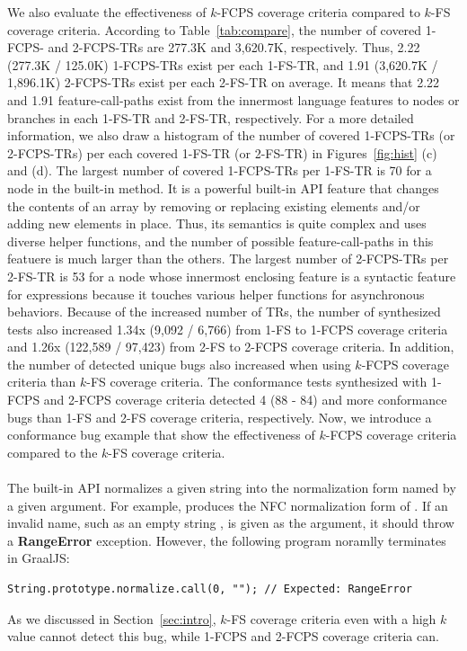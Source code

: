 We also evaluate the effectiveness of $k$-FCPS coverage criteria compared to $k$-FS
coverage criteria.
%
According to Table~\ref{tab:compare}, the number of covered 1-FCPS- and
2-FCPS-TRs are 277.3K and 3,620.7K, respectively.
%
Thus, 2.22 (277.3K / 125.0K) 1-FCPS-TRs exist per each 1-FS-TR, and 1.91
(3,620.7K / 1,896.1K) 2-FCPS-TRs exist per each 2-FS-TR on average.
%
It means that 2.22 and 1.91 feature-call-paths exist from the innermost
language features to nodes or branches in each 1-FS-TR and 2-FS-TR,
respectively.
%
For a more detailed information, we also draw a histogram of the number of
covered 1-FCPS-TRs (or 2-FCPS-TRs) per each covered 1-FS-TR (or 2-FS-TR) in
Figures~\ref{fig:hist} (c) and (d).
%
The largest number of covered 1-FCPS-TRs per 1-FS-TR is 70 for a node
in the  built-in method.
%
It is a powerful built-in API feature that changes the contents of an array by
removing or replacing existing elements and/or adding new elements in place.
%
Thus, its semantics is quite complex and uses diverse helper functions, and the
number of possible feature-call-paths in this featuere is much larger than
the others.
%
The largest number of 2-FCPS-TRs per 2-FS-TR is 53 for a node whose
innermost enclosing feature is a syntactic feature for  expressions
because it touches various helper functions for asynchronous behaviors.
%
Because of the increased number of TRs, the number of synthesized tests also
increased 1.34x (9,092 / 6,766) from 1-FS to 1-FCPS coverage criteria and 1.26x
(122,589 / 97,423) from 2-FS to 2-FCPS coverage criteria.
%
In addition, the number of detected unique bugs also increased when using
$k$-FCPS coverage criteria than $k$-FS coverage criteria.
%
The conformance tests synthesized with 1-FCPS and 2-FCPS coverage criteria
detected 4 (88 - 84) and  more conformance bugs than
1-FS and 2-FS coverage criteria, respectively.
%
Now, we introduce a conformance bug example that show the effectiveness of $k$-FCPS
coverage criteria compared to the $k$-FS coverage criteria.


\paragraph{\textbf{}}
%
The  built-in API normalizes a given string
into the normalization form named by a given argument.
%
For example,  produces the NFC normalization form
of .
%
If an invalid name, such as an empty string , is given as the
argument, it should throw a \textbf{RangeError} exception.
%
However, the following program noramlly terminates in GraalJS:
\begin{lstlisting}[style=JS, basicstyle=\footnotesize\ttfamily]
    String.prototype.normalize.call(0, ""); // Expected: RangeError
\end{lstlisting}
As we discussed in Section~\ref{sec:intro},
$k$-FS coverage criteria even with a high $k$ value cannot detect this bug,
while 1-FCPS and 2-FCPS coverage criteria can.


